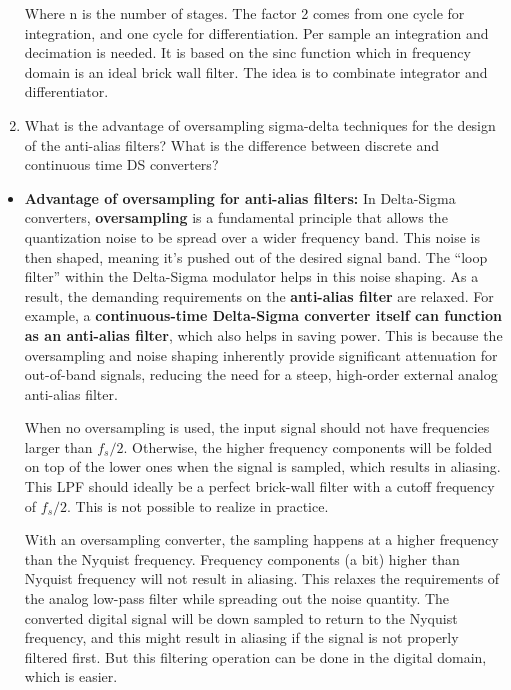 \documentclass[
  a4paper,
]{article}
\begin{document}
\begin{enumerate}
  Where n is the number of stages. The factor 2 comes from one cycle for
  integration, and one cycle for differentiation. Per sample an
  integration and decimation is needed. It is based on the sinc function
  which in frequency domain is an ideal brick wall filter. The idea is
  to combinate integrator and differentiator.
\item
  What is the advantage of oversampling sigma-delta techniques for the
  design of the anti-alias filters? What is the difference between
  discrete and continuous time DS converters?
\end{enumerate}

\begin{itemize}
\item
  \textbf{Advantage of oversampling for anti-alias filters:} In
  Delta-Sigma converters, \textbf{oversampling} is a fundamental
  principle that allows the quantization noise to be spread over a wider
  frequency band. This noise is then shaped, meaning it's pushed out of
  the desired signal band. The ``loop filter'' within the Delta-Sigma
  modulator helps in this noise shaping. As a result, the demanding
  requirements on the \textbf{anti-alias filter} are relaxed. For
  example, a \textbf{continuous-time Delta-Sigma converter itself can
  function as an anti-alias filter}, which also helps in saving power.
  This is because the oversampling and noise shaping inherently provide
  significant attenuation for out-of-band signals, reducing the need for
  a steep, high-order external analog anti-alias filter.

  When no oversampling is used, the input signal should not have
  frequencies larger than \(f_s/2\). Otherwise, the higher frequency
  components will be folded on top of the lower ones when the signal is
  sampled, which results in aliasing. This LPF should ideally be a
  perfect brick-wall filter with a cutoff frequency of \(f_s/2\). This
  is not possible to realize in practice.

  With an oversampling converter, the sampling happens at a higher
  frequency than the Nyquist frequency. Frequency components (a bit)
  higher than Nyquist frequency will not result in aliasing. This
  relaxes the requirements of the analog low-pass filter while spreading
  out the noise quantity. The converted digital signal will be down
  sampled to return to the Nyquist frequency, and this might result in
  aliasing if the signal is not properly filtered first. But this
  filtering operation can be done in the digital domain, which is
  easier.


\end{itemize}
\end{document}
